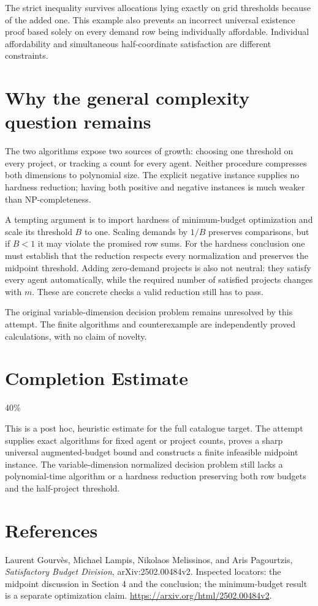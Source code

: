 \documentclass[11pt]{article}
\begin{document}
The strict inequality survives allocations lying exactly on grid
thresholds because of the added one. This example also prevents an
incorrect universal existence proof based solely on every demand row
being individually affordable. Individual affordability and simultaneous
half-coordinate satisfaction are different constraints.

\section*{Why the general complexity question remains}
The two algorithms expose two sources of growth: choosing one threshold
on every project, or tracking a count for every agent. Neither procedure
compresses both dimensions to polynomial size. The explicit negative
instance supplies no hardness reduction; having both positive and
negative instances is much weaker than NP-completeness.

A tempting argument is to import hardness of minimum-budget optimization
and scale its threshold $B$ to one. Scaling demands by $1/B$ preserves
comparisons, but if $B<1$ it may violate the promised row sums. For the
hardness conclusion one must establish that the reduction respects every
normalization and preserves the midpoint threshold. Adding zero-demand
projects is also not neutral: they satisfy every agent automatically,
while the required number of satisfied projects changes with $m$.
These are concrete checks a valid reduction still has to pass.

The original variable-dimension decision problem remains unresolved by
this attempt. The finite algorithms and counterexample are independently
proved calculations, with no claim of novelty.

\section{Completion Estimate}
40\%

This is a post hoc, heuristic estimate for the full catalogue target.
The attempt supplies exact algorithms for fixed agent or project counts, proves a sharp universal augmented-budget bound and constructs a finite infeasible midpoint instance. The variable-dimension normalized decision problem still lacks a polynomial-time algorithm or a hardness reduction preserving both row budgets and the half-project threshold.

\section*{References}
Laurent Gourv\`es, Michael Lampis, Nikolaos Melissinos, and Aris
Pagourtzis, \emph{Satisfactory Budget Division}, arXiv:2502.00484v2.
Inspected locators: the midpoint discussion in Section 4 and the
conclusion; the minimum-budget result is a separate optimization claim.
\url{https://arxiv.org/html/2502.00484v2}.
\end{document}
